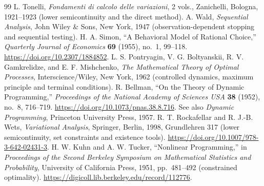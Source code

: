 \documentclass[11pt,letterpaper]{article}
\theoremstyle{definition}\newtheorem{definition}{Definition}
\begin{document}
\begin{thebibliography}{99}
 L. Tonelli, \emph{Fondamenti di calcolo delle variazioni}, 2 vols., Zanichelli, Bologna, 1921--1923 (lower semicontinuity and the direct method).
 A. Wald, \emph{Sequential Analysis}, John Wiley \& Sons, New York, 1947 (observation-dependent stopping and sequential testing).
 H. A. Simon, ``A Behavioral Model of Rational Choice,'' \emph{Quarterly Journal of Economics} \textbf{69} (1955), no.~1, 99--118. \url{https://doi.org/10.2307/1884852}.
 L. S. Pontryagin, V. G. Boltyanskii, R. V. Gamkrelidze, and E. F. Mishchenko, \emph{The Mathematical Theory of Optimal Processes}, Interscience/Wiley, New York, 1962 (controlled dynamics, maximum principle and terminal conditions).
 R. Bellman, ``On the Theory of Dynamic Programming,'' \emph{Proceedings of the National Academy of Sciences USA} \textbf{38} (1952), no.~8, 716--719. \url{https://doi.org/10.1073/pnas.38.8.716}. See also \emph{Dynamic Programming}, Princeton University Press, 1957.
 R. T. Rockafellar and R. J.-B. Wets, \emph{Variational Analysis}, Springer, Berlin, 1998, Grundlehren 317 (lower semicontinuity, set constraints and existence tools). \url{https://doi.org/10.1007/978-3-642-02431-3}.
 H. W. Kuhn and A. W. Tucker, ``Nonlinear Programming,'' in \emph{Proceedings of the Second Berkeley Symposium on Mathematical Statistics and Probability}, University of California Press, 1951, pp.~481--492 (constrained optimality). \url{https://digicoll.lib.berkeley.edu/record/112776}.
\end{thebibliography}
\end{document}
